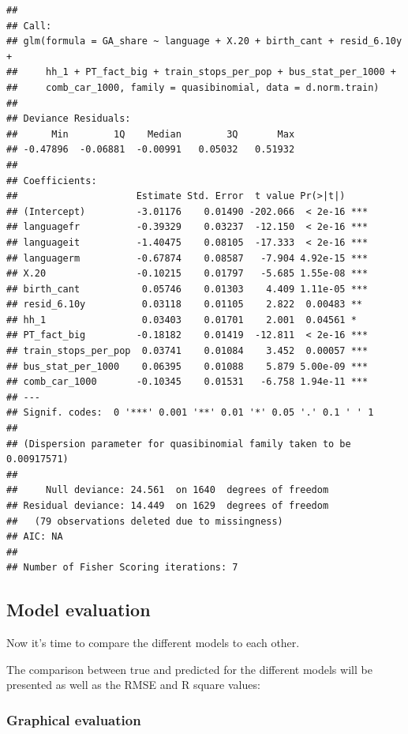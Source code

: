 \documentclass[
]{article}
\begin{document}
\begin{verbatim}
## 
## Call:
## glm(formula = GA_share ~ language + X.20 + birth_cant + resid_6.10y + 
##     hh_1 + PT_fact_big + train_stops_per_pop + bus_stat_per_1000 + 
##     comb_car_1000, family = quasibinomial, data = d.norm.train)
## 
## Deviance Residuals: 
##      Min        1Q    Median        3Q       Max  
## -0.47896  -0.06881  -0.00991   0.05032   0.51932  
## 
## Coefficients:
##                     Estimate Std. Error  t value Pr(>|t|)    
## (Intercept)         -3.01176    0.01490 -202.066  < 2e-16 ***
## languagefr          -0.39329    0.03237  -12.150  < 2e-16 ***
## languageit          -1.40475    0.08105  -17.333  < 2e-16 ***
## languagerm          -0.67874    0.08587   -7.904 4.92e-15 ***
## X.20                -0.10215    0.01797   -5.685 1.55e-08 ***
## birth_cant           0.05746    0.01303    4.409 1.11e-05 ***
## resid_6.10y          0.03118    0.01105    2.822  0.00483 ** 
## hh_1                 0.03403    0.01701    2.001  0.04561 *  
## PT_fact_big         -0.18182    0.01419  -12.811  < 2e-16 ***
## train_stops_per_pop  0.03741    0.01084    3.452  0.00057 ***
## bus_stat_per_1000    0.06395    0.01088    5.879 5.00e-09 ***
## comb_car_1000       -0.10345    0.01531   -6.758 1.94e-11 ***
## ---
## Signif. codes:  0 '***' 0.001 '**' 0.01 '*' 0.05 '.' 0.1 ' ' 1
## 
## (Dispersion parameter for quasibinomial family taken to be 0.00917571)
## 
##     Null deviance: 24.561  on 1640  degrees of freedom
## Residual deviance: 14.449  on 1629  degrees of freedom
##   (79 observations deleted due to missingness)
## AIC: NA
## 
## Number of Fisher Scoring iterations: 7
\end{verbatim}

\hypertarget{model-evaluation}{%
\subsection{Model evaluation}\label{model-evaluation}}

Now it's time to compare the different models to each other.

The comparison between true and predicted for the different models will
be presented as well as the RMSE and R square values:

\hypertarget{graphical-evaluation}{%
\subsubsection{Graphical evaluation}\label{graphical-evaluation}}
\end{document}
